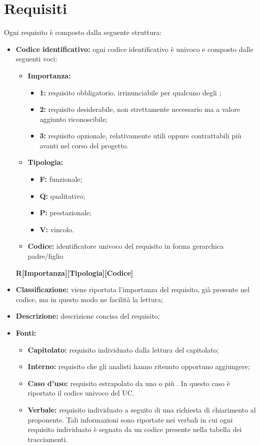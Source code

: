 \section{Requisiti}
Ogni requisito è composto dalla seguente struttura: 
\begin{itemize}
	\item \textbf{Codice identificativo:} ogni codice identificativo è univoco e composto dalle seguenti voci:
	\begin{itemize}
	\item \textbf{Importanza:}
	\begin{itemize}
	\item \textbf{1:} requisito obbligatorio, irrinunciabile per qualcuno degli ;
	\item \textbf{2:} requisito desiderabile, non strettamente necessario ma a valore aggiunto riconoscibile;
	\item \textbf{3:} requisito opzionale, relativamente utili oppure contrattabili più avanti nel corso del progetto.
	\end{itemize}
	\item \textbf{Tipologia:}
	\begin{itemize}
	\item \textbf{F:} funzionale;
	\item \textbf{Q:} qualitativo;
	\item \textbf{P:} prestazionale;
	\item \textbf{V:} vincolo.
	\end{itemize}
	\item \textbf{Codice:} identificatore univoco del requisito in forma gerarchica padre/figlio
	\end{itemize}
	\begin{center}
	\textbf{R[Importanza][Tipologia][Codice]}
	\end{center}
	\item \textbf{Classificazione:} viene riportata l'importanza del requisito, già presente nel codice, ma in questo modo ne facilità la lettura;
	\item \textbf{Descrizione:} descrizione concisa del requisito;
	\item \textbf{Fonti:}
	\begin{itemize}
	\item \textbf{Capitolato:} requisito individuato dalla lettura del capitolato;
	\item \textbf{Interno:} requisito che gli analisti hanno ritenuto opportuno aggiungere;
	\item \textbf{Caso d'uso:} requisito estrapolato da uno o più . In questo caso è riportato il codice univoco del UC.
	\item \textbf{Verbale:} requisito individuato a seguito di una richiesta di chiarimento al proponente. Tali informazioni sono riportate nei verbali in cui ogni requisito individuato è segnato da un codice presente nella tabella dei tracciamenti.
	\end{itemize}
\end{itemize}
\newpage




